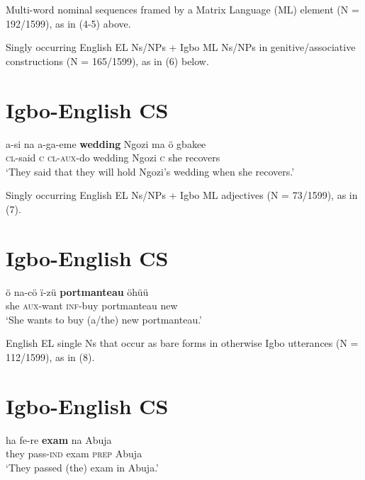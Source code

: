 \documentclass[output=paper]{langsci/langscibook}
\begin{document}
\begin{stylelsBulletList}
Multi-word nominal sequences framed by a Matrix Language (ML) element (N = 192/1599), as in (4-5) above.
\end{stylelsBulletList}

\begin{stylelsBulletList}
Singly occurring English EL Ns/NPs + Igbo ML Ns/NPs in genitive/associative constructions (N = 165/1599), as in (6) below.
\end{stylelsBulletList}

\chapter[Igbo{}-English CS]{Igbo-English \textsc{CS}}
\gll a-si    na  a-ga-eme   \textbf{wedding  }Ngozi  ma   ö  gbakee\\
     \textsc{cl}{}-said  \textsc{c  cl-aux}{}-do  wedding  Ngozi  \textsc{c}\textsubscript{  }she  recovers\\
\glt ‘They said that they will hold Ngozi’s wedding when she recovers.’
\z

\begin{styleListBullet}
Singly occurring English EL Ns/NPs + Igbo ML adjectives (N = 73/1599), as in (7).
\end{styleListBullet}

\chapter[Igbo{}-English CS]{Igbo-English \textsc{CS}}
\gll ö  na-cö    ï-zü    \textbf{portmanteau  }öhüü \\
     she  \textsc{aux}{}-want  \textsc{inf}{}-buy  portmanteau  new\\
\glt ‘She wants to buy (a/the) new portmanteau.’
\z

\begin{styleListBullet}
English EL single Ns that occur as bare forms in otherwise Igbo utterances (N = 112/1599), as in (8).
\end{styleListBullet}

\chapter[Igbo{}-English CS]{Igbo-English \textsc{CS}}
\gll ha    fe-re    \textbf{exam}  na   Abuja\\
     they  pass-\textsc{ind}\textsubscript{  }exam  \textsc{prep}  Abuja \\
\glt ‘They passed (the) exam in Abuja.’
\z
\end{document}
